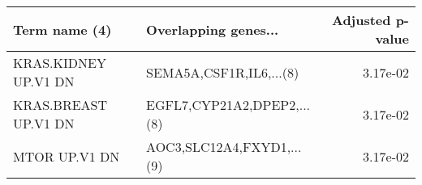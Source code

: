 \begin{tabular}{llr}
\toprule
       Term name (4) &       Overlapping genes... &  Adjusted p-value \\
\midrule
KRAS.KIDNEY UP.V1 DN &    SEMA5A,CSF1R,IL6,...(8) &          3.17e-02 \\
KRAS.BREAST UP.V1 DN & EGFL7,CYP21A2,DPEP2,...(8) &          3.17e-02 \\
       MTOR UP.V1 DN &  AOC3,SLC12A4,FXYD1,...(9) &          3.17e-02 \\
\bottomrule
\end{tabular}

